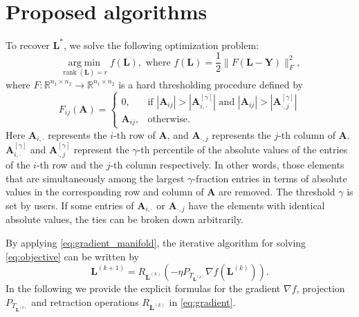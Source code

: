 \documentclass[12pt]{article}
\newcommand{\grad}{\nabla}
\newcommand{\argmin}{\operatorname*{arg\; min}}
\newcommand{\rank}{\operatorname{rank}}
\newcommand{\bL}{\boldsymbol{L}}
\def\reals{\mathbb{R}}
\def\bA{\boldsymbol{A}}
\def\bY{\boldsymbol{Y}}
\theoremstyle{plain}
\theoremstyle{definition}
\theoremstyle{plain}
\theoremstyle{plain}
\theoremstyle{remark}
\begin{document}
\section{Proposed algorithms}\label{sec:alg}
To  recover $\bL^{*}$, we solve the following optimization problem:
\begin{equation}\label{eq:objective}
{  \argmin_{\rank(\bL)=r}f(\bL), \,\,\text{where $f(\bL)=\frac{1}{2}\|F(\bL-\bY)\|_F^2$},}
\end{equation}
where $F: \reals^{n_1\times n_2}\rightarrow\reals^{n_1\times n_2}$ is a hard thresholding procedure defined by
\begin{equation}\label{eq:threshold}
F_{ij}(\bA)=\begin{cases}0, &\text{if $|\bA_{ij}|> |\bA_{i,\cdot}^{[\gamma ]}|$ and $|\bA_{ij}|> |\bA_{\cdot,j}^{[\gamma ]}|$}\\
\bA_{ij}, &\text{otherwise}.\end{cases}
\end{equation}
Here $\bA_{i,\cdot}$ represents the $i$-th row of $\bA$, and $\bA_{\cdot,j}$ represents the $j$-th column of $\bA$. $\bA_{i,\cdot}^{[\gamma]}$ and $\bA_{\cdot,j}^{[\gamma]}$ represent the $\gamma$-th percentile of the absolute values of the entries of the $i$-th row and the $j$-th column respectively.
In other words, those elements that are simultaneously among the largest $\gamma$-fraction entries in terms of absolute values in the corresponding row and column of $\bA$ are removed. The threshold $\gamma$ is set by users. If some entries of $\bA_{i,\cdot}$ or $\bA_{\cdot,j}$ have the elements with identical absolute values, the ties can be broken down arbitrarily. 

By applying \eqref{eq:gradient_manifold}, the iterative algorithm for solving \eqref{eq:objective} can be written by
\begin{equation}\label{eq:gradient}
\bL^{(k+1)}=R_{\bL^{(k)}}(-\eta P_{T_{\bL^{(k)}}} \grad f(\bL^{(k)})).
\end{equation}
In the following we provide the explicit formulas for the gradient $\grad f$, projection $P_{T_{\bL^{(k)}}}$ and retraction operations $R_{\bL^{(k)}}$  in \eqref{eq:gradient}.
\end{document}
